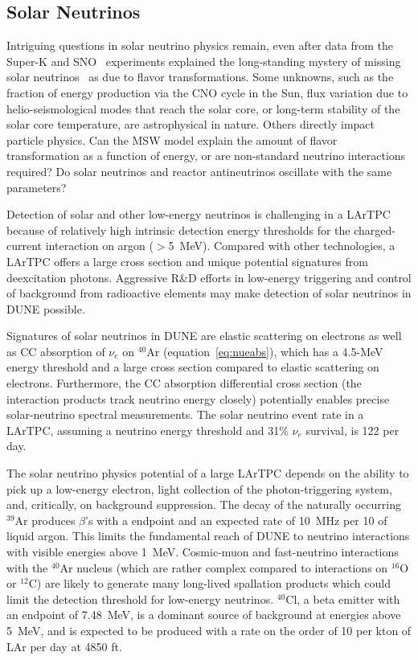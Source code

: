 \subsection{Solar Neutrinos}

Intriguing questions in solar neutrino physics remain,
even after data
from the Super-K and SNO~\cite{Fukuda:2001nj,Ahmad:2001an}
experiments explained the long-standing mystery of missing solar
neutrinos~\cite{Cleveland:1998nv} as due to flavor
transformations. 
Some unknowns, such as the fraction of energy production via the CNO
cycle in the Sun, flux variation due to helio-seismological modes that
reach the solar core, or long-term stability of the solar core
temperature, are astrophysical in nature. Others directly impact
particle physics. Can the MSW model explain the amount of flavor
transformation as a function of energy, or are non-standard neutrino
interactions required?  Do solar neutrinos and reactor antineutrinos
oscillate with the same parameters? 

Detection of solar and other low-energy neutrinos is challenging in
a LArTPC because of relatively high intrinsic detection energy thresholds for
the charged-current interaction on argon ($>$\SI{5}{\MeV}). 
Compared with other technologies, a LArTPC offers a large
cross section and unique potential signatures from deexcitation
photons. Aggressive R\&D efforts in low-energy triggering and
control of background from radioactive elements may make detection
of solar neutrinos in DUNE possible.

Signatures of solar neutrinos in DUNE
are elastic scattering on electrons as well as CC absorption of $\nu_e$ on $^{40}$Ar (equation~\ref{eq:nueabs}), which has a 4.5-MeV energy threshold and a large cross section compared to elastic scattering on electrons.  Furthermore, the CC absorption differential cross section (the interaction products track neutrino energy closely) potentially enables precise solar-neutrino spectral measurements.
The solar neutrino event rate in a
 LArTPC, assuming a  neutrino energy
threshold and 31\% $\nu_e$ survival, is 122 per day.


The solar neutrino physics potential of a large LArTPC depends
on the ability to pick up a low-energy electron, light collection of the photon-triggering system,
and, critically, on background suppression. 
The decay of the naturally occurring $^{39}$Ar
produces $\beta$'s with a  endpoint and an expected rate
of \SI{10}{\MHz} per \SI{10}{\kt} of liquid argon. This limits the
fundamental reach of DUNE to neutrino interactions with visible
energies above \SI{1}{\MeV}. 
Cosmic-muon and fast-neutrino  interactions with the $^{40}$Ar nucleus (which are rather complex
compared to interactions on $^{16}$O or $^{12}$C) are likely to generate many long-lived spallation products which could limit the
detection threshold for low-energy neutrinos.
$^{40}$Cl, a beta emitter with an
endpoint of \SI{7.48}{\MeV}, is a dominant source of background at
energies above \SI{5}{\MeV}, and is expected to be produced with a rate on the order of 10 per kton of LAr per day at 4850 ft.



